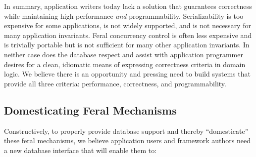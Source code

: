 In summary, application writers today lack a solution that guarantees
correctness while maintaining high performance \textit{and}
programmability. Serializability is too expensive for some
applications, is not widely supported, and is not necessary for many
application invariants. Feral concurrency control is often less
expensive and is trivially portable but is not sufficient for many other
application invariants. In neither case does the database respect and
assist with application programmer desires for a clean, idiomatic
means of expressing correctness criteria in domain logic. We believe
there is an opportunity and pressing need to build systems that
provide all three criteria: performance, correctness, and
programmability.

\subsection{Domesticating Feral Mechanisms}

Constructively, to properly provide database support and thereby
``domesticate'' these feral mechanisms, we believe application users
and framework authors need a new database interface that will enable
them to:

